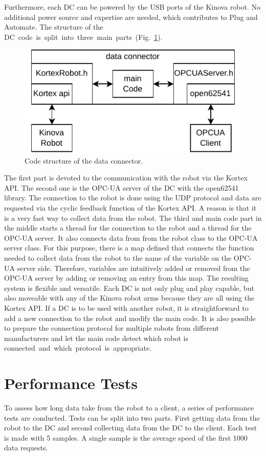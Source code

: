 \documentclass[conference]{IEEEtran}
\begin{document}
Furthermore, each DC can  be powered by the USB ports of the Kinova robot. No additional power source and expertise are needed, which contributes to Plug and Automate. The structure of the \mbox{DC code is split into three main parts (Fig. \ref{fig:dataConectorStructure}).}

\begin{figure}[b]
    \centerline{\includegraphics{Pictures/dataConectorStructure.pdf}}
    \caption{Code structure of the data connector.}
    \label{fig:dataConectorStructure}
\end{figure}
The first part is devoted to the communication with the robot via the Kortex API. The second one is the OPC-UA server of the DC with the open62541 library.
The connection to the robot is done using the UDP protocol and  data are requested via the cyclic feedback function of the Kortex API. A reason is that it is a very fast way to collect  data from the robot.
The third and main code part in the middle  starts a thread for the connection to the robot and a thread for the OPC-UA server. It also connects  data from from the robot class to the OPC-UA server class. For this purpose, there is a map defined that connects the function needed to collect  data from the robot to the name of the variable on the OPC-UA server side.
Therefore, variables are intuitively added or removed  from the OPC-UA server by adding or removing an entry from this map. The resulting  system is flexible and versatile. Each DC is not only plug and play capable, but also moveable with any of the Kinova robot arms because they are all using the Kortex API. 
If a DC is to be used with another robot, it is straightforward to add a new connection to the robot and modify the main code.
It is also possible to prepare the connection protocol for multiple robots from different manufacturers and let the main code detect which robot is \mbox{connected and which protocol is appropriate.}

\section{Performance Tests}
To assess how long data take from the robot to a client, a series of performance tests are conducted.
Tests can be split into two parts. 
First getting  data from the robot to the DC and second collecting  data from the DC to the client.
Each test is made with 5 samples. A single sample is the average speed of the first 1000 data requests.
\end{document}
